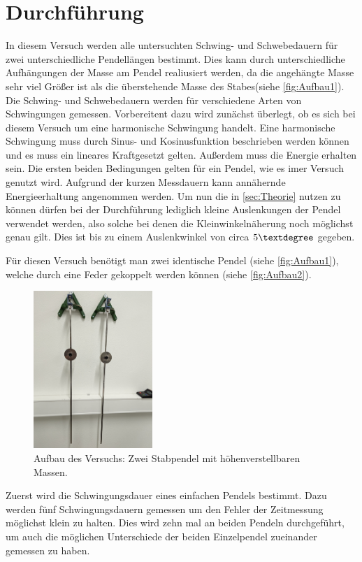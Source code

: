 \section{Durchführung}
\label{sec:Durchführung}
In diesem Versuch werden alle untersuchten Schwing- und Schwebedauern für zwei unterschiedliche Pendellängen bestimmt. Dies kann durch unterschiedliche Aufhängungen der Masse am 
Pendel realiusiert werden, da die angehängte Masse sehr viel Größer ist als die überstehende Masse des Stabes(siehe \autoref{fig:Aufbau1}).
Die Schwing- und Schwebedauern werden für verschiedene Arten von Schwingungen gemessen. Vorbereitent dazu wird zunächst überlegt, ob es sich bei diesem Versuch um eine 
harmonische Schwingung handelt. Eine harmonische Schwingung muss durch  Sinus- und Kosinusfunktion beschrieben werden können und es muss ein lineares Kraftgesetzt gelten.
Außerdem muss die Energie erhalten sein. Die ersten beiden Bedingungen gelten für ein Pendel, wie es imer Versuch genutzt wird. Aufgrund der kurzen Messdauern kann annähernde 
Energieerhaltung angenommen werden. Um nun die in \autoref{sec:Theorie} nutzen zu können dürfen bei der Durchführung lediglich kleine Auslenkungen der Pendel verwendet werden, 
also solche bei denen die Kleinwinkelnäherung noch möglichst genau gilt. Dies ist bis zu einem Auslenkwinkel von circa $5\textdegree$ gegeben. 


Für diesen Versuch benötigt man zwei identische Pendel (siehe \autoref{fig:Aufbau1}), welche durch eine Feder gekoppelt werden können (siehe \autoref{fig:Aufbau2}).
\begin{figure}
    \centering
    \includegraphics[width=0.4\textwidth]{content/Einzelpendel.jpg}
	\caption{Aufbau des Versuchs: Zwei Stabpendel mit höhenverstellbaren Massen.}
	\label{fig:Aufbau1}
\end{figure}
Zuerst wird die Schwingungsdauer eines einfachen Pendels bestimmt. Dazu werden fünf Schwingungsdauern gemessen um den Fehler der Zeitmessung möglichst klein zu halten.
Dies wird zehn mal an beiden Pendeln durchgeführt, um auch die möglichen Unterschiede der beiden Einzelpendel zueinander gemessen zu haben. 


